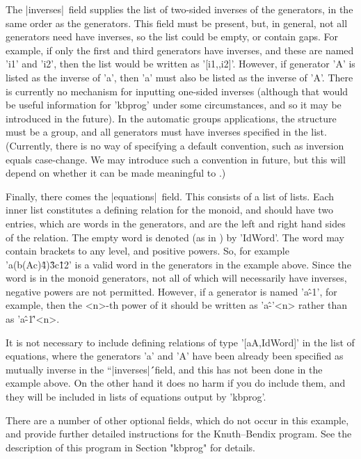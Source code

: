 The |inverses|\ field supplies the list of two-sided inverses of the
generators, in the same order as the generators. This field must be present,
but, in general, not all generators need have inverses, so the list could
be empty, or contain gaps. For example, if only the first and third
generators have inverses, and these are named 'i1' and 'i2', then the list
would be written as '[i1,,i2]'.  However, if generator 'A' is listed as the
inverse of 'a', then 'a' must also be listed as the inverse of 'A'.
There is currently no mechanism for inputting one-sided inverses (although
that would be useful information for 'kbprog' under some circumstances, and so
it may be introduced in the future).
In the automatic groups applications, the structure must be a group, and all
generators must have inverses specified in the list.
(Currently, there is no way of specifying a default convention, such as
inversion equals case-change. We may introduce such a convention in
future, but this will depend on whether it can be made meaningful to
{\GAP}.)

Finally, there comes the |equations|\ field. This consists of a list of
lists. Each inner list constitutes a defining relation for the
monoid, and should have two entries, which are words in the generators,
and are the left and right hand sides of the relation.
The empty word is denoted (as in {\GAP}) by 'IdWord'.
The word may contain brackets to any level, and positive powers.
So, for example 'a\*(b\*(A\*c)\^4)\^3\*c\^12' is a valid word in the generators
in the example above.
Since the word is in the monoid generators, not all of which will
necessarily have inverses, negative powers are not permitted.
However, if a generator is named 'a\^-1', for example, then the <n>-th
power of it should be written as 'a\^-'<n> rather than as 'a\^-1\^'<n>. 

It is not necessary to include defining relations of type
'[a\*A,IdWord]' in the list of equations, where the generators 'a' and 'A'
have been already been specified as mutually inverse in the ``|inverses|\'\'\ 
field, and this has not been done in the example above. On the other hand
it does no harm if you do include them, and they will be included in
lists of equations output by 'kbprog'.

There are a number of other optional fields, which do not occur in this example,
and provide further detailed instructions for the Knuth--Bendix program.
See the description of this program in Section "kbprog" for details.


